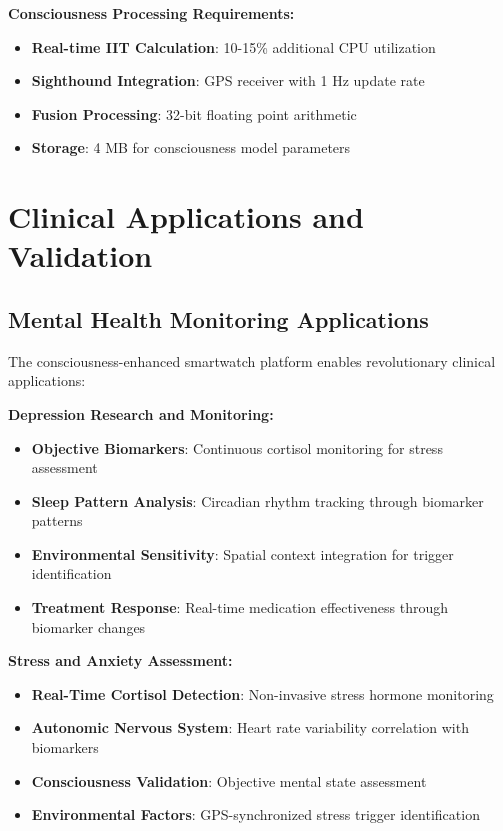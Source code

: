 \documentclass[12pt,a4paper]{article}
\begin{document}
\textbf{Consciousness Processing Requirements:}
\begin{itemize}
\item \textbf{Real-time IIT Calculation}: 10-15\% additional CPU utilization
\item \textbf{Sighthound Integration}: GPS receiver with 1 Hz update rate
\item \textbf{Fusion Processing}: 32-bit floating point arithmetic
\item \textbf{Storage}: 4 MB for consciousness model parameters
\end{itemize}

\section{Clinical Applications and Validation}

\subsection{Mental Health Monitoring Applications}

The consciousness-enhanced smartwatch platform enables revolutionary clinical applications:

\textbf{Depression Research and Monitoring:}
\begin{itemize}
\item \textbf{Objective Biomarkers}: Continuous cortisol monitoring for stress assessment
\item \textbf{Sleep Pattern Analysis}: Circadian rhythm tracking through biomarker patterns
\item \textbf{Environmental Sensitivity}: Spatial context integration for trigger identification
\item \textbf{Treatment Response}: Real-time medication effectiveness through biomarker changes
\end{itemize}

\textbf{Stress and Anxiety Assessment:}
\begin{itemize}
\item \textbf{Real-Time Cortisol Detection}: Non-invasive stress hormone monitoring
\item \textbf{Autonomic Nervous System}: Heart rate variability correlation with biomarkers
\item \textbf{Consciousness Validation}: Objective mental state assessment
\item \textbf{Environmental Factors}: GPS-synchronized stress trigger identification
\end{itemize}
\end{document}
